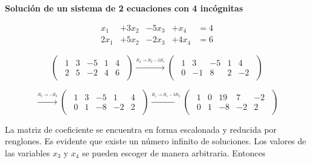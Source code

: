 \documentclass{article}
\begin{document}
\begin{large}
    \textbf{Solución de un sistema de 2 ecuaciones con 4 incógnitas}
\end{large}

\begin{equation*}
    \begin{aligned}
    x_1 &+ 3x_2 &- 5x_3 &+ x_4 &= 4 \\
    2x_1 &+ 5x_2 &- 2x_3 &+ 4x_4 &= 6    
    \end{aligned}
\end{equation*}

\begin{equation*}
    \begin{pmatrix}
        \begin{array}{rrrr|r}
            1 & 3 & -5 & 1 & 4\\
            2 & 5 & -2 & 4 & 6
        \end{array}
    \end{pmatrix}
\xrightarrow{\stackrel{R_2 \rightarrow R_2 - 2R_1}{}}
    \begin{pmatrix}
        \begin{array}{rrrr|r}
            1 & 3 & -5 & 1 & 4\\
            0 & -1 & 8 & 2 & -2
        \end{array}
    \end{pmatrix}
\end{equation*}

\begin{equation*}
    \xrightarrow{\stackrel{R_2 \rightarrow -R_2}{}}
    \begin{pmatrix}
        \begin{array}{rrrr|r}
            1 & 3 & -5 & 1 & 4\\
            0 & 1 & -8 & -2 & 2
        \end{array}
    \end{pmatrix}
\xrightarrow{\stackrel{R_1 \rightarrow R_1 - 3R_2}{}}
    \begin{pmatrix}
        \begin{array}{rrrr|r}
            1 & 0 & 19 & 7 & -2\\
            0 & 1 & -8 & -2 & 2
        \end{array}
    \end{pmatrix}
\end{equation*}

La matriz de coeficiente se encuentra en forma escalonada y reducida por renglones. Es evidente que existe un número infinito de soluciones. Los valores de las variables $x_3$ y $x_4$ se pueden escoger de manera arbitraria. Entonces 
\end{document}
